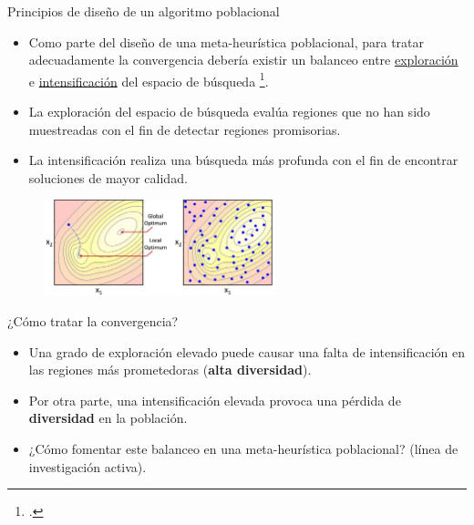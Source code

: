 \documentclass{beamer}
\begin{document}
\begin{frame}{Principios de diseño de un algoritmo poblacional}
\begin{itemize}
\justifying
    \item Como parte del diseño de una meta-heurística poblacional, para tratar adecuadamente la convergencia debería existir un balanceo entre \underline{exploración} e \underline{intensificación} del espacio de búsqueda \footcite{herrera1996adaptation}.
    \item La exploración del espacio de búsqueda evalúa regiones que no han sido muestreadas con el fin de detectar regiones promisorias.
    \item La intensificación realiza una búsqueda más profunda con el fin de encontrar soluciones de mayor calidad.
    
\end{itemize}
\begin{figure}
\includegraphics[width=0.6\textwidth]{Images/exploration_2.png}
\label{fig:clasificacion}
\end{figure}

\end{frame}

\begin{frame}{¿Cómo tratar la convergencia?}
\begin{itemize}
\justifying
    \item Una grado de exploración elevado puede causar una falta de intensificación en las regiones más prometedoras (\textbf{alta diversidad}).
    \item Por otra parte, una intensificación elevada provoca una pérdida de \textbf{diversidad} en la población.
    \item ¿Cómo fomentar este balanceo en una meta-heurística poblacional? (línea de investigación activa).
\end{itemize}
\end{frame}
\end{document}
